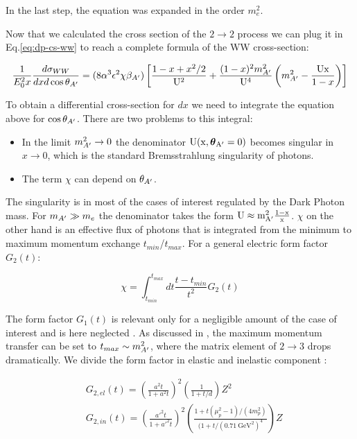  In the last step, the equation was expanded in the order $m^2_e$.

 Now that we calculated the cross section of the $2 \to 2$ process we can plug it in Eq.\ref{eq:dp-cs-ww} to reach a complete formula of the WW cross-section:

 \begin{equation}
   \label{eq:dp-cs-ww-num}
   \frac{1}{E^2_0 x} \frac{d\sigma_{WW}}{dx d\cos{\theta_{A'}}} = (8 \alpha^3 \epsilon^2 \chi \beta_{A'}) \left[ \frac{1 - x + x^2/2}{\rm{U}^2} + \frac{(1-x)^2m^2_{A'}}{\rm{U}^4} \left(m^2_{A'} - \frac{\rm{U}x}{1 - x} \right) \right]
 \end{equation}

 To obtain a differential cross-section for $dx$ we need to integrate the equation above for $\cos{\theta_{A'}}$. There are two problems to this integral:

 \begin{itemize}
 \item In the limit $m^2_{A'} \to 0$ the denominator $\rm{U}(x, \boldsymbol{\theta}_{A'} = 0)$ becomes singular in $x \to 0$, which is the standard Bremsstrahlung singularity of photons.   
 \item The term $\chi$ can depend on $\theta_{A'}$.
 \end{itemize}

 The singularity is in most of the cases of interest regulated by the Dark Photon mass. For $m_{A'} \gg m_e$ the denominator takes the form $\rm{U} \approx m^2_{A'} \frac{1-x}{x}$.
 $\chi$ on the other hand is an effective flux of photons that is integrated from the minimum to maximum momentum exchange $t_{min}$/$t_{max}$. For a general electric form factor $G_2(t)$:

 \begin{equation}
   \label{eq:g-ff}
   \chi = \int^{t_{max}}_{t_{min}} dt \frac{t - t_{min}}{t^2} G_2(t)
 \end{equation}

 The form factor $G_1(t)$ is relevant only for a negligible amount of the case of interest and is here neglected \cite{Kim:1973he}. As discussed in \cite{Kim:1973he,RevModPhys.46.815}, the maximum momentum transfer can be set to $t_{max} \sim m^2_{A'}$, where the matrix element of $2 \to 3$ drops dramatically. We divide the form factor in elastic and inelastic component \cite{jdb}:

 \begin{align}
   \label{eq:g-ff-el}
   &G_{2,el}(t) = \left( \frac{a^2 t}{1 + a^2t} \right)^2 \left( \frac{1}{1 + t/d}\right) Z^2\\
   \label{eq:g-ff-in}
   &G_{2,in}(t) = \left( \frac{a'^2 t }{1 + a'^2 t} \right)^2 \left( \frac{1 + t (\mu_p^2 -1) / (4m^2_p)}{(1 + t / (\SI{0.71}{\giga\electronvolt\squared})^4} \right) Z
 \end{align}

